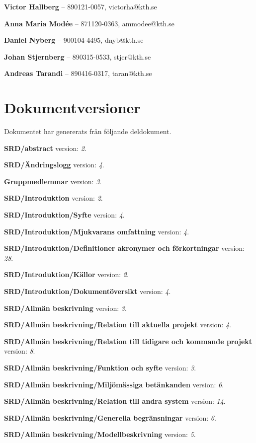\documentclass[a4paper, twoside, 11pt, titlepage]{article}
\begin{document}
\textbf{Victor Hallberg} -- 890121-0057, victorha@kth.se

\textbf{Anna Maria Modée} -- 871120-0363, ammodee@kth.se 

\textbf{Daniel Nyberg} -- 900104-4495, dnyb@kth.se 

\textbf{Johan Stjernberg} -- 890315-0533, stjer@kth.se

\textbf{Andreas Tarandi} -- 890416-0317, taran@kth.se

\clearpage
\section*{Dokumentversioner}


Dokumentet har genererats från följande deldokument.

\textbf{SRD/abstract} version: \emph{2}.

\textbf{SRD/Ändringslogg} version: \emph{4}.

\textbf{Gruppmedlemmar} version: \emph{3}.

\textbf{SRD/Introduktion} version: \emph{2}.

\textbf{SRD/Introduktion/Syfte} version: \emph{4}.

\textbf{SRD/Introduktion/Mjukvarans omfattning} version: \emph{4}.

\textbf{SRD/Introduktion/Definitioner akronymer och förkortningar} version: \emph{28}.

\textbf{SRD/Introduktion/Källor} version: \emph{2}.

\textbf{SRD/Introduktion/Dokumentöversikt} version: \emph{4}.

\textbf{SRD/Allmän beskrivning} version: \emph{3}.

\textbf{SRD/Allmän beskrivning/Relation till aktuella projekt} version: \emph{4}.

\textbf{SRD/Allmän beskrivning/Relation till tidigare och kommande projekt} version: \emph{8}.

\textbf{SRD/Allmän beskrivning/Funktion och syfte} version: \emph{3}.

\textbf{SRD/Allmän beskrivning/Miljömässiga betänkanden} version: \emph{6}.

\textbf{SRD/Allmän beskrivning/Relation till andra system} version: \emph{14}.

\textbf{SRD/Allmän beskrivning/Generella begränsningar} version: \emph{6}.

\textbf{SRD/Allmän beskrivning/Modellbeskrivning} version: \emph{5}.
\end{document}
